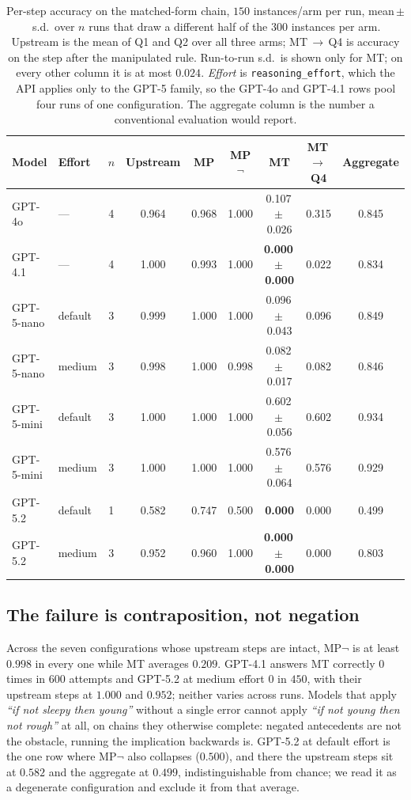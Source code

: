 \documentclass{article}
\begin{document}
\begin{table}[h]
\centering\small
\caption{Per-step accuracy on the matched-form chain, $150$ instances/arm per
run, mean\,$\pm$\,s.d.\ over $n$ runs that draw a different half of the $300$
instances per arm. Upstream is the mean of Q1 and Q2 over all three arms;
MT\,$\to$\,Q4 is accuracy on the step after the manipulated rule. Run-to-run
s.d.\ is shown only for MT; on every other column it is at most $0.024$.
\emph{Effort} is \texttt{reasoning\_effort}, which the API applies only to the
GPT-5 family, so the GPT-4o and GPT-4.1 rows pool four runs of one
configuration. The aggregate
column is the number a conventional evaluation would report.}
\label{tab:chain}
\setlength{\tabcolsep}{4pt}
\begin{tabular}{llccccccc}
\toprule
\textbf{Model} & \textbf{Effort} & $n$ & \textbf{Upstream} & \textbf{MP} & \textbf{MP$\neg$} & \textbf{MT} & \textbf{MT\,$\to$\,Q4} & \textbf{Aggregate} \\
\midrule
GPT-4o      & ---     & 4 & 0.964 & 0.968 & 1.000 & 0.107\,$\pm$\,0.026 & 0.315 & 0.845 \\
GPT-4.1     & ---     & 4 & 1.000 & 0.993 & 1.000 & \textbf{0.000\,$\pm$\,0.000} & 0.022 & 0.834 \\
GPT-5-nano  & default & 3 & 0.999 & 1.000 & 1.000 & 0.096\,$\pm$\,0.043 & 0.096 & 0.849 \\
GPT-5-nano  & medium  & 3 & 0.998 & 1.000 & 0.998 & 0.082\,$\pm$\,0.017 & 0.082 & 0.846 \\
GPT-5-mini  & default & 3 & 1.000 & 1.000 & 1.000 & 0.602\,$\pm$\,0.056 & 0.602 & 0.934 \\
GPT-5-mini  & medium  & 3 & 1.000 & 1.000 & 1.000 & 0.576\,$\pm$\,0.064 & 0.576 & 0.929 \\
GPT-5.2     & default & 1 & 0.582 & 0.747 & 0.500 & \textbf{0.000} & 0.000 & 0.499 \\
GPT-5.2     & medium  & 3 & 0.952 & 0.960 & 1.000 & \textbf{0.000\,$\pm$\,0.000} & 0.000 & 0.803 \\
\bottomrule
\end{tabular}
\end{table}

\subsection{The failure is contraposition, not negation}
Across the seven
configurations whose upstream steps are intact, MP$\neg$ is at least $0.998$
in every one while MT averages $0.209$. GPT-4.1 answers MT correctly $0$ times
in $600$ attempts and GPT-5.2 at medium effort $0$ in $450$, with their upstream steps at $1.000$ and
$0.952$; neither varies across runs. Models that apply \emph{``if not sleepy
then young''} without a single error cannot apply \emph{``if not young then not
rough''} at all, on chains they otherwise complete: negated antecedents are not
the obstacle, running the implication backwards is. GPT-5.2 at default effort is
the one row where MP$\neg$ also collapses ($0.500$), and there the upstream steps
sit at $0.582$ and the aggregate at $0.499$, indistinguishable from chance; we
read it as a degenerate configuration and exclude it from that average.
\end{document}
